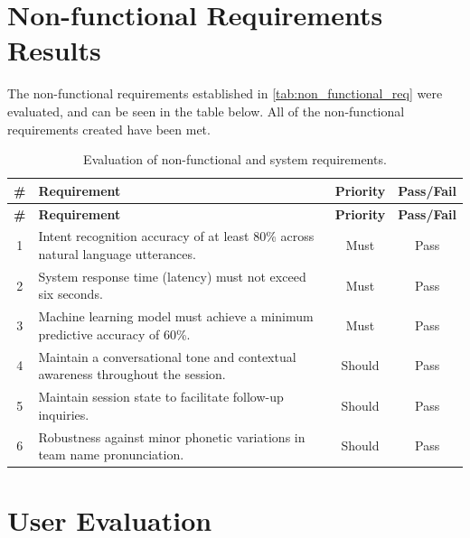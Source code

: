 \section{Non-functional Requirements Results}
The non-functional requirements established in \autoref{tab:non_functional_req} were evaluated, and can be seen in the table below. All of the non-functional requirements created have been met.
{\small
\begin{longtable}{@{} c >{\raggedright\arraybackslash}p{8.5cm} c c @{}}
    \caption{Evaluation of non-functional and system requirements.}
    \label{tab:system_requirements_evaluation} \\
    
    \toprule
    \textbf{\#} & \textbf{Requirement} & \textbf{Priority} & \textbf{Pass/Fail} \\
    \midrule
    \endfirsthead
    
    \toprule
    \textbf{\#} & \textbf{Requirement} & \textbf{Priority} & \textbf{Pass/Fail} \\
    \midrule
    \endhead
    
    \endfoot
    
    \bottomrule
    \endlastfoot
    
    1 & Intent recognition accuracy of at least 80\% across natural language utterances. & Must & Pass \\
    \midrule
    
    2 & System response time (latency) must not exceed six seconds. & Must & Pass \\
    \midrule
    
    3 & Machine learning model must achieve a minimum predictive accuracy of 60\%. & Must & Pass \\
    \midrule
    
    4 & Maintain a conversational tone and contextual awareness throughout the session. & Should & Pass \\
    \midrule
    
    5 & Maintain session state to facilitate follow-up inquiries. & Should & Pass \\
    \midrule
    
    6 & Robustness against minor phonetic variations in team name pronunciation. & Should & Pass \\

\end{longtable}
}

\section{User Evaluation}

